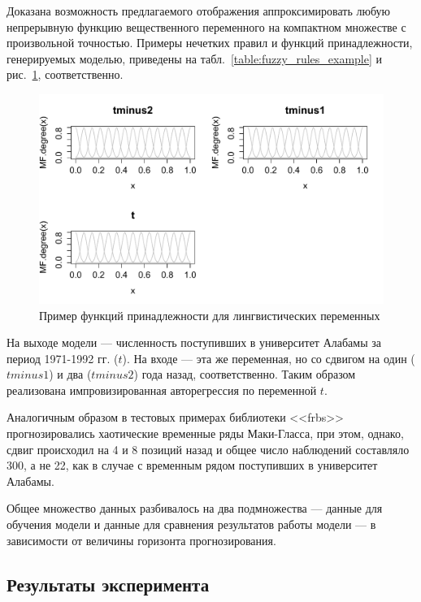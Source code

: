 Доказана возможность предлагаемого отображения аппроксимировать любую
непрерывную функцию вещественного переменного на компактном множестве с
произвольной точностью.  Примеры нечетких правил и функций принадлежности,
генерируемых моделью, приведены на табл.~\ref{table:fuzzy_rules_example} и
рис.~\ref{figure:MFexample}, соответственно.  

\renewcommand{\arraystretch}{1.5} %
\setlength{\tabcolsep}{8pt} %

\begin{figure}[bhtp]
    \includegraphics{images/MFexample.pdf}
    \caption{Пример функций принадлежности для лингвистических переменных}		
    \label{figure:MFexample}
\end{figure}

На выходе модели --- численность поступивших в университет Алабамы за период 1971-1992 гг. ($t$). На входе --- эта же переменная, но со сдвигом на один ($tminus1$) и два ($tminus2$) года назад, соответственно. Таким образом реализована импровизированная авторегрессия по переменной $t$. 

Аналогичным образом в тестовых примерах библиотеки <<frbs>> прогнозировались хаотические временные ряды Маки-Гласса, при этом, однако, сдвиг происходил на 4 и 8 позиций назад и общее число наблюдений составляло 300, а не 22, как в случае с временным рядом поступивших в университет Алабамы.

Общее множество данных разбивалось на два подмножества --- данные для обучения модели и данные для сравнения результатов работы модели --- в зависимости от величины горизонта прогнозирования. 

\subsection{Результаты эксперимента}

